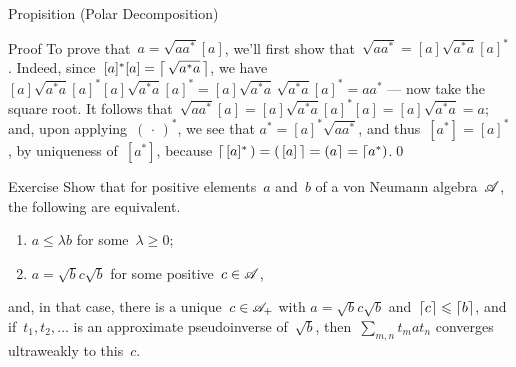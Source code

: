 \documentclass[a]{subfiles}
\begin{document}
\begin{parsec}
\begin{point}{Propisition (Polar Decomposition)}
\begin{point}{Proof}
To prove that~$a=\sqrt{aa^*}[a]$,
we'll first show that~$\sqrt{aa^*} = [a] \sqrt{a^*a} [a]^*$.
Indeed, since~$[a]^*[a]=\left\lceil\,\sqrt{a^*a}\,\right\rceil$,
we have
$[a]\sqrt{a^*a}[a]^*[a]\sqrt{a^*a}[a]^*
= [a] \sqrt{a^*a} \,\sqrt{a^*a} [a]^* 
= aa^*$ --- now take the square root.
It follows that~$\sqrt{aa^*}[a]
= [a]\sqrt{a^*a}[a]^*[a]
= [a]\sqrt{a^*a}=a$;
and, upon applying~$(\,\cdot\,)^*$,
we see that
$a^*=[a]^*\sqrt{aa^*}$,
and thus~$[a^*]=[a]^*$,
by uniqueness of~$[a^*]$,
because $\left\lceil\,[a]^*\,\right)=\left(\,[a]\,\right\rceil=  \left(a\right\rceil
=\left\lceil a^*\right)$.\qed
\end{point}
\end{point}
\begin{point}{Exercise}%
Show that for positive elements~$a$ and~$b$ of a von Neumann
algebra~$\mathscr{A}$,
the following are equivalent.
\begin{enumerate}
\item
$a\leq \lambda b$ for some~$\lambda\geq 0$;
\item
$a=\sqrt{b}c\sqrt{b}$
for some positive~$c\in\mathscr{A}$,
\end{enumerate}
and, 
in that case, there is a unique~$c\in\mathscr{A}_+$
with $a=\sqrt{b}c\sqrt{b}$
and~$\left\lceil c\right\rceil\leqslant \left\lceil b\right\rceil$,
and if~$t_1,t_2,\dotsc$
is an approximate pseudoinverse of~$\sqrt{b}$,
then~$\sum_{m,n} t_m a t_n$
converges ultraweakly to this~$c$.
\end{point}
\end{parsec}
\end{document}

